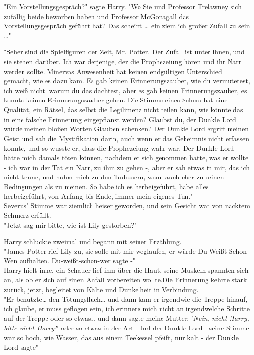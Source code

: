{"Ein Vorstellungsgespräch?" sagte Harry. "Wo Sie und Professor Trelawney sich zufällig beide beworben haben und Professor McGonagall das Vorstellungsgespräch geführt hat? Das scheint … ein ziemlich großer Zufall zu sein …"

"Seher sind die Spielfiguren der Zeit, Mr. Potter. Der Zufall ist unter ihnen, und sie stehen darüber. Ich war derjenige, der die Prophezeiung hören und ihr Narr werden sollte. Minervas Anwesenheit hat keinen endgültigen Unterschied gemacht, wie es dazu kam. Es gab keinen Erinnerungszauber, wie du vermutetest, ich weiß nicht, warum du das dachtest, aber es gab keinen Erinnerungszauber, es konnte keinen Erinnerungszauber geben. Die Stimme eines Sehers hat eine Qualität, ein Rätsel, das selbst die Legilimenz nicht teilen kann, wie könnte das in eine falsche Erinnerung eingepflanzt werden? Glaubst du, der Dunkle Lord würde meinen bloßen Worten Glauben schenken? Der Dunkle Lord ergriff meinen Geist und sah die Mystifikation darin, auch wenn er das Geheimnis nicht erfassen konnte, und so wusste er, dass die Prophezeiung wahr war. Der Dunkle Lord hätte mich damals töten können, nachdem er sich genommen hatte, was er wollte - ich war in der Tat ein Narr, zu ihm zu gehen -, aber er sah etwas in mir, das ich nicht kenne, und nahm mich zu den Todessern, wenn auch eher zu seinen Bedingungen als zu meinen. So habe ich es herbeigeführt, habe alles herbeigeführt, von Anfang bis Ende, immer mein eigenes Tun."\\ Severus' Stimme war ziemlich heiser geworden, und sein Gesicht war von nacktem Schmerz erfüllt.\\ "Jetzt sag mir bitte, wie ist Lily gestorben?"

Harry schluckte zweimal und begann mit seiner Erzählung.\\ "James Potter rief Lily zu, sie solle mit mir weglaufen, er würde Du-Weißt-Schon-Wen aufhalten. Du-weißt-schon-wer sagte -"\\ Harry hielt inne, ein Schauer lief ihm über die Haut, seine Muskeln spannten sich an, als ob er sich auf einen Anfall vorbereiten wollte.Die Erinnerung kehrte stark zurück, jetzt, begleitet von Kälte und Dunkelheit in Verbindung.\\ "Er benutzte… den Tötungsfluch… und dann kam er irgendwie die Treppe hinauf, ich glaube, er muss geflogen sein, ich erinnere mich nicht an irgendwelche Schritte auf der Treppe oder so etwas… und dann sagte meine Mutter: '\emph{Nein, nicht Harry, bitte nicht Harry!}' oder so etwas in der Art. Und der Dunkle Lord - seine Stimme war so hoch, wie Wasser, das aus einem Teekessel pfeift, nur kalt - der Dunkle Lord sagte" -

}
